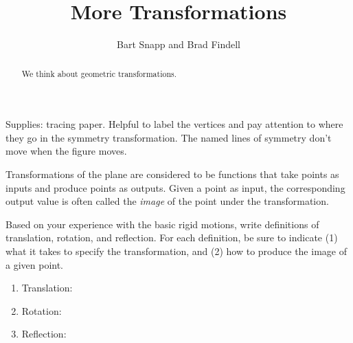 \documentclass[nooutcomes]{ximera}
\title{More Transformations}
\author{Bart Snapp and Brad Findell}
\begin{document}
\begin{abstract}
  We think about geometric transformations.
\end{abstract}
\maketitle

\begin{teachingnote}
Supplies:  tracing paper.  Helpful to label the vertices and pay attention to where they go in the symmetry transformation.  The named lines of symmetry don't move when the figure moves.
\end{teachingnote}

Transformations of the plane are considered to be functions that take points as inputs and produce 
points as outputs.  Given a point as input, the corresponding output value is often called 
the \emph{image} of the point under the transformation.
\begin{problem}
Based on your experience with the basic rigid motions, write definitions of translation, rotation, and reflection.
For each definition, be sure to indicate (1) what it takes to specify the transformation, and (2) how to produce the image of a given point.  
\begin{enumerate}
\item Translation: 
\vspace{0.3in}
\item Rotation: 
\vspace{0.3in}
\item Reflection: 
\vspace{0.3in}
\end{enumerate}
\end{problem}
\end{document}
